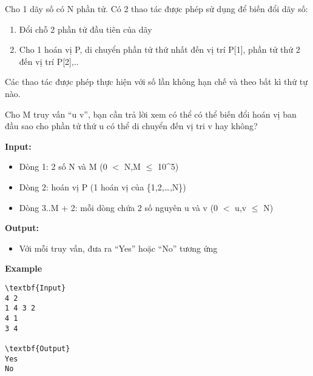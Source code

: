 

Cho 1 dãy số có N phần tử. Có 2 thao tác được phép sử dụng để biến đổi dãy số:
\begin{enumerate}
	\item 

Đổi chỗ 2 phần tử đầu tiên của dãy
	\item 

Cho 1 hoán vị P, di chuyển phần tử thứ nhất đến vị trí P[1], phần tử thứ 2 đến vị trí P[2],..
\end{enumerate}

Các thao tác được phép thực hiện với số lần không hạn chế và theo bất kì thứ tự nào.

Cho M truy vấn “u v”, bạn cần trả lời xem có thể có thể biến đổi hoán vị ban đầu sao cho phần tử thứ u có thể di chuyển đến vị tri v hay không?

\textbf{Input:}
\begin{itemize}
	\item 

Dòng 1: 2 số N và M (0 $<$ N,M  $\le$  10\textasciicircum5)
	\item 

Dòng 2: hoán vị P (1 hoán vị của \{1,2,…,N\})
	\item 

Dòng 3..M + 2: mỗi dòng chứa 2 số nguyên u và v (0 $<$ u,v  $\le$  N)
\end{itemize}

\textbf{Output:}
\begin{itemize}
	\item 

Với mỗi truy vấn, đưa ra “Yes” hoặc “No” tương ứng
\end{itemize}

\textbf{Example}
\begin{verbatim}
\textbf{Input}
4 2
1 4 3 2
4 1
3 4

\textbf{Output}
Yes
No\end{verbatim}

 

 
